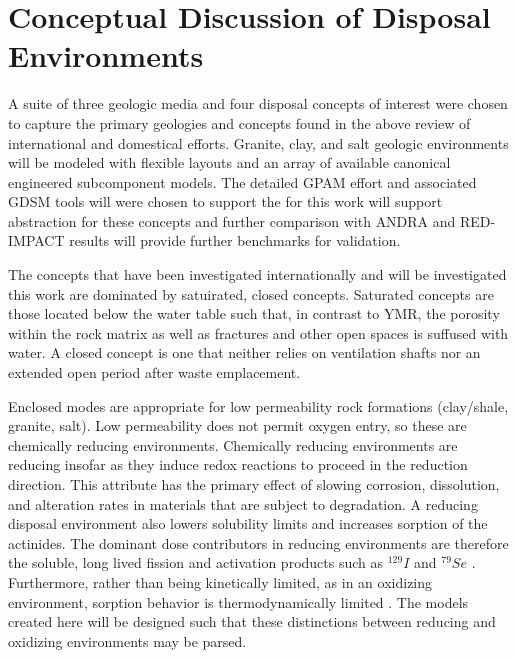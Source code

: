 \section{Conceptual Discussion of Disposal Environments}





A suite of three geologic media and four disposal concepts of interest were
chosen to capture the primary geologies and concepts found in the above review 
of international and domestical efforts. Granite, clay, and salt geologic 
environments will be modeled with flexible layouts and an array of available 
canonical engineered subcomponent models.  The detailed \gls{GPAM} effort and 
associated \gls{GDSM} tools will were chosen to support the for this work will 
support abstraction for these concepts and further comparison with \gls{ANDRA} 
and RED-IMPACT results will provide further benchmarks for validation.  

The concepts that have been investigated internationally and will be
investigated this work are dominated by satuirated, closed concepts. Saturated 
concepts are those located below the water table such that, in contrast to 
\gls{YMR}, the porosity within the rock matrix as well as fractures 
and other open spaces is suffused with water. A closed concept is one that 
neither relies on ventilation shafts nor an extended open period after waste 
emplacement.

Enclosed modes are appropriate for low permeability rock formations (clay/shale, 
granite, salt).  Low permeability does not permit oxygen entry, so these are
chemically reducing environments.  Chemically reducing environments are reducing 
insofar as they induce  redox reactions to proceed in the reduction direction. This 
attribute has the primary effect of slowing corrosion, dissolution, and  
alteration rates in materials that are subject to degradation. A reducing 
disposal environment also lowers solubility limits and increases sorption of the 
actinides. The dominant dose contributors in reducing environments are 
therefore the soluble, long lived fission and activation products such as $^{129}I$ 
and $^{79}Se$ \cite{oecd_advanced_2006, von_lensa_red-impact_2008}.  
Furthermore, rather than being kinetically limited, as in an oxidizing 
environment, sorption behavior is thermodynamically limited 
\cite{nutt_personal_2011, schwartz_fundamentals_2004}. The models created here 
will be designed such that these distinctions between reducing and oxidizing 
environments may be parsed. 

